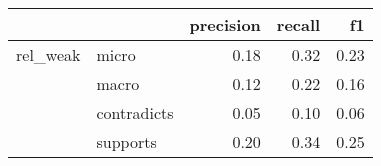 \begin{tabular}{llrrr}
\toprule
         &          &  precision &  recall &   f1 \\
\midrule
rel\_weak & micro &       0.18 &    0.32 & 0.23 \\
         & macro &       0.12 &    0.22 & 0.16 \\
         & contradicts &       0.05 &    0.10 & 0.06 \\
         & supports &       0.20 &    0.34 & 0.25 \\
\bottomrule
\end{tabular}
